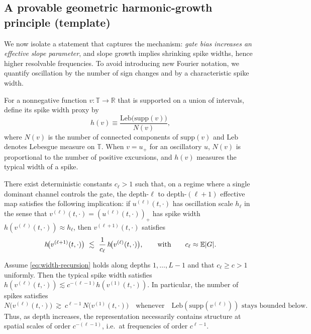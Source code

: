 \subsection{A provable geometric harmonic-growth principle (template)}

We now isolate a statement that captures the mechanism: \emph{gate bias increases an effective slope parameter}, and slope growth implies shrinking spike widths, hence higher resolvable frequencies.
To avoid introducing new Fourier notation, we quantify oscillation by the number of sign changes and by a characteristic spike width.

\begin{definition}\label{def:spike-width-proxy}
For a nonnegative function $v:\mathbb{T}\to\mathbb{R}$ that is supported on a union of intervals, define its spike width proxy by
\[
h(v)\equiv \frac{\mathrm{Leb}\big(\mathrm{supp}(v)\big)}{N(v)},
\]
where $N(v)$ is the number of connected components of $\mathrm{supp}(v)$ and $\mathrm{Leb}$ denotes Lebesgue measure on $\mathbb{T}$.
When $v=u_+$ for an oscillatory $u$, $N(v)$ is proportional to the number of positive excursions, and $h(v)$ measures the typical width of a spike.
\end{definition}

\begin{assumption}\label{assump:gate-sharpen}
\openflag
There exist deterministic constants $c_\ell>1$ such that, on a regime where a single dominant channel controls the gate, the depth-$\ell$ to depth-$(\ell+1)$ effective map satisfies the following implication:
if $u^{(\ell)}(t,\cdot)$ has oscillation scale $h_\ell$ in the sense that $v^{(\ell)}(t,\cdot)=(u^{(\ell)}(t,\cdot))_+$ has spike width $h(v^{(\ell)}(t,\cdot))\approx h_\ell$, then $v^{(\ell+1)}(t,\cdot)$ satisfies
\begin{equation}\label{eq:width-recursion}
h\!\big(v^{(\ell+1)}(t,\cdot)\big)\ \lesssim\ \frac{1}{c_\ell}\,h\!\big(v^{(\ell)}(t,\cdot)\big),
\qquad \text{with}\qquad c_\ell \approx \E|G|.
\end{equation}
\end{assumption}

\begin{lemma}\label{lem:geom-width-to-freq}
\provedflag
Assume \eqref{eq:width-recursion} holds along depths $1,\dots,L-1$ and that $c_\ell\ge c>1$ uniformly.
Then the typical spike width satisfies $h(v^{(\ell)}(t,\cdot))\lesssim c^{-(\ell-1)} h(v^{(1)}(t,\cdot))$.
In particular, the number of spikes satisfies
\[
N\!\big(v^{(\ell)}(t,\cdot)\big)\ \gtrsim\ c^{\ell-1}\,N\!\big(v^{(1)}(t,\cdot)\big)
\quad\text{whenever}\quad \mathrm{Leb}(\mathrm{supp}(v^{(\ell)})) \text{ stays bounded below.}
\]
Thus, as depth increases, the representation necessarily contains structure at spatial scales of order $c^{-(\ell-1)}$, i.e.\ at frequencies of order $c^{\ell-1}$.
\end{lemma}

